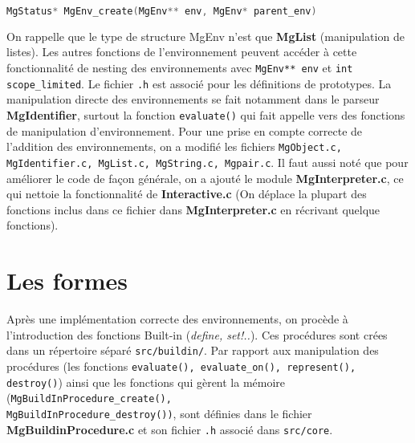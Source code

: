 \documentclass[11pt]{article}
\begin{document}
\begin{lstlisting}[language=C]
MgStatus* MgEnv_create(MgEnv** env, MgEnv* parent_env) 
\end{lstlisting}
On rappelle que le type de structure MgEnv n'est que \textbf{MgList} (manipulation de listes). Les autres fonctions de l'environnement peuvent acc\'eder \`a cette fonctionnalit\'e de nesting des environnements avec \texttt{MgEnv** env} et \texttt{int scope\_limited}. Le fichier \texttt{.h} est associ\'e pour les d\'efinitions de prototypes.\newline
La manipulation directe des environnements se fait notamment dans le parseur \textbf{MgIdentifier}, surtout la fonction \texttt{evaluate()} qui fait appelle vers des fonctions de manipulation d'environnement.\newline\newline
Pour une prise en compte correcte de l'addition des environnements, on a modifi\'e les fichiers \texttt{MgObject.c, MgIdentifier.c, MgList.c, MgString.c, Mgpair.c}.\newline\newline
Il faut aussi not\'e que pour am\'eliorer le code de fa\c con g\'en\'erale, on a ajout\'e le module \textbf{MgInterpreter.c}, ce qui nettoie la fonctionnalit\'e de \textbf{Interactive.c} (On d\'eplace la plupart des fonctions inclus dans ce fichier dans \textbf{MgInterpreter.c} en r\'ecrivant quelque fonctions).

\section{Les formes}
Apr\`es une impl\'ementation correcte des environnements, on proc\`ede \`a l'introduction des fonctions Built-in (\textit{define, set!..}). Ces proc\'edures sont cr\'ees dans un r\'epertoire s\'epar\'e \texttt{src/buildin/}.\newline\newline
Par rapport aux manipulation des proc\'edures (les fonctions \texttt{evaluate(), evaluate\_on(), represent(), destroy()}) ainsi que les fonctions qui g\`erent la m\'emoire (\texttt{MgBuildInProcedure\_create(),\\ MgBuildInProcedure\_destroy())}, sont d\'efinies dans le fichier \textbf{MgBuildinProcedure.c} et son fichier \texttt{.h} associ\'e dans \texttt{src/core}.\newline\newline
\end{document}
